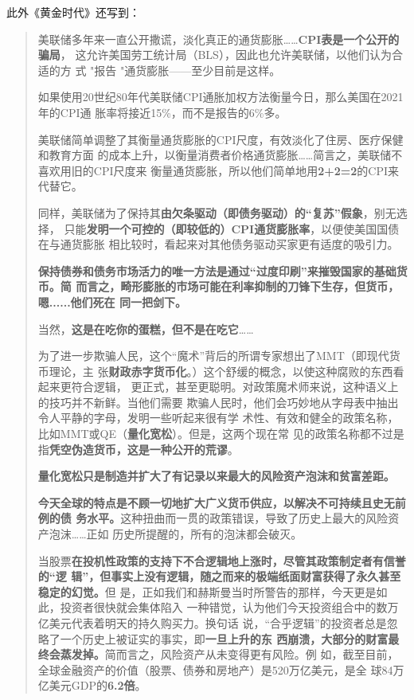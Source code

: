 此外《黄金时代》还写到：
\begin{quotation}
  美联储多年来一直公开撒谎，淡化真正的通货膨胀……\textbf{CPI表是一个公开的骗局}，
  这允许美国劳工统计局（BLS），因此也允许美联储，以他们认为合适的方
  式 "报告 "通货膨胀——至少目前是这样。

  如果使用20世纪80年代美联储CPI通胀加权方法衡量今日，那么美国在2021年的CPI通
  胀率将接近15\%，而不是报告的6\%多。

  美联储简单调整了其衡量通货膨胀的CPI尺度，有效淡化了住房、医疗保健和教育方面
  的成本上升，以衡量消费者价格通货膨胀……简言之，美联储不喜欢用旧的CPI尺度来
  衡量通货膨胀，所以他们简单地用\textbf{2+2=2}的CPI来代替它。

  同样，美联储为了保持其\textbf{由欠条驱动（即债务驱动）的“复苏”假象}，别无选择，
  只能\textbf{发明一个可控的（即较低的）CPI通货膨胀率}，以便使美国国债在与通货膨胀
  相比较时，看起来对其他债务驱动买家更有适度的吸引力。


  \textbf{保持债券和债务市场活力的唯一方法是通过“过度印刷”来摧毁国家的基础货币。简
  而言之，畸形膨胀的市场可能在利率抑制的刀锋下生存，但货币，嗯......他们死在
  同一把剑下。}

  当然，\textbf{这是在吃你的蛋糕，但不是在吃它}……

  为了进一步欺骗人民，这个“魔术”背后的所谓专家想出了MMT（即现代货币理论，主
  张\textbf{财政赤字货币化}。）这个舒缓的概念，以使这种腐败的东西看起来更符合逻辑，
  更正式，甚至更聪明。对政策魔术师来说，这种语义上的技巧并不新鲜。当他们需要
  欺骗人民时，他们会巧妙地从字母表中抽出令人平静的字母，发明一些听起来很有学
  术性、有效和健全的政策名称，比如MMT或QE（\textbf{量化宽松}）。但是，这两个现在常
  见的政策名称都不过是指\textbf{凭空伪造货币，这是一种公开的荒谬}。

  \textbf{量化宽松只是制造并扩大了有记录以来最大的风险资产泡沫和贫富差距。}

  \textbf{今天全球的特点是不顾一切地扩大广义货币供应，以解决不可持续且史无前例的债
    务水平。}这种扭曲而一贯的政策错误，导致了历史上最大的风险资产泡沫……正如
  历史所提醒的，所有的泡沫都会破灭。


  当股票\textbf{在投机性政策的支持下不合逻辑地上涨时，尽管其政策制定者有信誉的“逻
    辑”，但事实上没有逻辑，随之而来的极端纸面财富获得了永久甚至稳定的幻觉。}但
  是，正如我们和赫斯曼当时所警告的那样，今天更是如此，投资者很快就会集体陷入
  一种错觉，认为他们今天投资组合中的数万亿美元代表着明天的持久购买力。换句话
  说，“合乎逻辑”的投资者总是忽略了一个历史上被证实的事实，即\textbf{一旦上升的东
    西崩溃，大部分的财富最终会蒸发掉。}简而言之，风险资产从未变得更有风险。例
  如，截至目前，全球金融资产的价值（股票、债券和房地产）是520万亿美元，是全
  球84万亿美元GDP的\textbf{6.2倍}。


\end{quotation}
